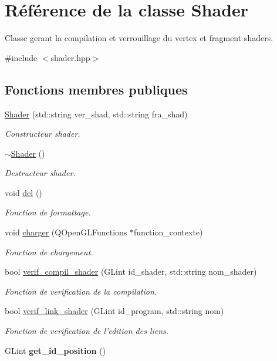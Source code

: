 \hypertarget{classShader}{\section{Référence de la classe Shader}
\label{classShader}
}


Classe gerant la compilation et verrouillage du vertex et fragment shaders.  




{\ttfamily \#include $<$shader.\+hpp$>$}

\subsection*{Fonctions membres publiques}
\begin{DoxyCompactItemize}
\item 
\hyperlink{classShader_a2005793fac68487fb1f8b76fcdd6dfa2}{Shader} (std\+::string ver\+\_\+shad, std\+::string fra\+\_\+shad)
\begin{DoxyCompactList}\small\item\em Constructeur shader. \end{DoxyCompactList}\item 
\hyperlink{classShader_aff01df87e8a102f270b5b135a295e59d}{$\sim$\+Shader} ()
\begin{DoxyCompactList}\small\item\em Destructeur shader. \end{DoxyCompactList}\item 
void \hyperlink{classShader_ad6fe36e8abe4842214b604467ae653c4}{del} ()
\begin{DoxyCompactList}\small\item\em Fonction de formattage. \end{DoxyCompactList}\item 
void \hyperlink{classShader_a41eeb2d28f161e822e09b8471ceb1bad}{charger} (Q\+Open\+G\+L\+Functions $\ast$function\+\_\+contexte)
\begin{DoxyCompactList}\small\item\em Fonction de chargement. \end{DoxyCompactList}\item 
bool \hyperlink{classShader_a2ecd01e476085e7e53d8d2d0ffb45944}{verif\+\_\+compil\+\_\+shader} (G\+Lint id\+\_\+shader, std\+::string nom\+\_\+shader)
\begin{DoxyCompactList}\small\item\em Fonction de verification de la compilation. \end{DoxyCompactList}\item 
bool \hyperlink{classShader_af019e34beca44951ef6245fcdfc0daae}{verif\+\_\+link\+\_\+shader} (G\+Lint id\+\_\+program, std\+::string nom)
\begin{DoxyCompactList}\small\item\em Fonction de verification de l'edition des liens. \end{DoxyCompactList}\item 
\hypertarget{classShader_a2f22c874367a2a1df32772ae53687810}{G\+Lint {\bfseries get\+\_\+id\+\_\+position} ()}\label{classShader_a2f22c874367a2a1df32772ae53687810}


\end{DoxyCompactItemize}
